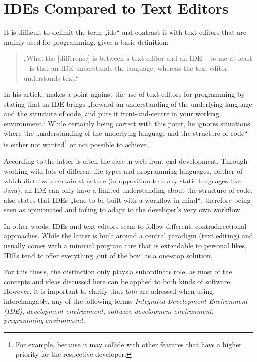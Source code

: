\section{IDEs Compared to Text
Editors}\label{ides-compared-to-text-editors}

It is difficult to delimit the term „\acl{ide}“ and contrast it with
text editors that are mainly used for programming. 
gives a basic definition:

\begin{quote}
„What the {[}difference{]} is between a text editor and an IDE – to me
at least – is that an IDE understands the language, whereas the text
editor understands text.“ \citeyear{reynolds}
\end{quote}

In his article,  makes a point against the use of
text editors for programming by stating that an IDE brings „forward an
understanding of the underlying language and the structure of code, and
puts it front-and-centre in your working environment.“
\citeyear{reynolds} While certainly being correct with this point, he
ignores situations where the „understanding of the underlying language
and the structure of code“ is either not
wanted\footnote{For example, because it may collide with other features that have a higher priority for the respective developer.}
or not possible to achieve.

According to  the latter is often the case in web
front-end development. Through working with lots of different file types
and programming languages, neither of which dictates a certain structure
(in opposition to many static languages like Java), an IDE can only have
a limited understanding about the structure of code. 
also states that IDEs „tend to be built with a workflow in mind“,
therefore being seen as opinionated and failing to adapt to the
developer’s very own workflow.

In other words, IDEs and text editors seem to follow different,
contradirectional approaches. While the latter is built around a central
paradigm (text editing) and usually comes with a minimal program core
that is extendable to personal likes, IDEs tend to offer everything ‚out
of the box‘ as a one-stop solution.

For this thesis, the distinction only plays a subordinate role, as most
of the concepts and ideas discussed here can be applied to both kinds of
software. However, it is important to clarify that \emph{both} are
adressed when using, interchangably, any of the following terms:
\emph{Integrated Development Environment (IDE)}, \emph{development
environment}, \emph{software development environment}, \emph{programming
environment}.

